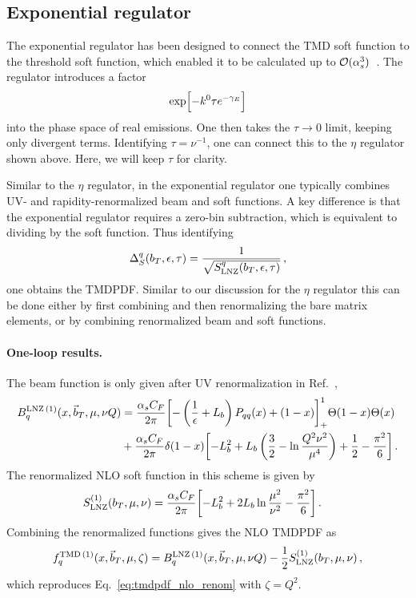 \documentclass[11pt,a4paper]{article}
\DeclareRobustCommand{\eq}[1]{Eq.~\eqref{eq:#1}}
\DeclareRobustCommand{\mycite}[1]{Ref.~\cite{#1}}
\newcommand{\eps}{\epsilon}
\newcommand{\nn}{\nonumber}
\newcommand{\as}{\alpha_s}
\newcommand\TMD{\mathrm{TMD}}
\newcommand{\bt}{\vec b_T}
\begin{document}
\subsection{Exponential regulator}

The exponential regulator \cite{Li:2016axz} has been designed to connect the TMD soft function to the
threshold soft function, which enabled it to be calculated up to ${\cal O}(\alpha_s^3)$~\cite{Li:2016ctv}.
The regulator introduces a factor
\begin{equation}
 \exp\Bigl[ - k^0 \tau e^{-\gamma_E} \Bigr]
\end{equation}
into the phase space of real emissions.
One then takes the $\tau\to0$ limit, keeping only divergent terms.
Identifying $\tau = \nu^{-1}$, one can connect this to the $\eta$ regulator shown above.
Here, we will keep $\tau$ for clarity.

Similar to the $\eta$ regulator, in the exponential regulator one typically combines UV- and rapidity-renormalized beam and soft functions. A key difference is that the exponential regulator requires a zero-bin subtraction, which is equivalent to dividing by the soft function. Thus identifying
\begin{align}
 \Delta_S^q(b_T,\eps,\tau) = \frac{1}{\sqrt{S^q_{\rm LNZ}(b_T,\eps,\tau)}}
\,,\end{align}
one obtains the TMDPDF. Similar to our discussion for the $\eta$ regulator this can be done either by first combining and then renormalizing the bare matrix elements,
or by combining renormalized beam and soft functions.

\paragraph{One-loop results.}
The beam function is only given after UV renormalization in \mycite{HuaXing},
\begin{align} \label{eq:beam_unsub_nlo_exp}
 B_{q}^{{\rm LNZ}\,(1)}(x, \bt, \mu, \nu Q)
  &= \frac{\as C_F}{2\pi} \biggl[ - \left(\frac{1}{\eps} + L_b\right) P_{qq}(x) + (1-x) \biggr]_+^1\Theta(1-x)\Theta(x)
 \nn\\&
  + \frac{\as C_F}{2\pi} \delta(1-x) \biggl[ - L_b^2 + L_b \left(\frac{3}{2} - \ln\frac{Q^2 \nu^2}{\mu^4} \right) + \frac{1}{2}  - \frac{\pi^2}{6}\biggr]
\,.\end{align}
The renormalized NLO soft function in this scheme is given by \cite{Li:2016axz}
\begin{align} \label{eq:soft_nlo_exp}
 S^{(1)}_{\rm LNZ}(b_T,\mu,\nu) &
 = \frac{\as C_F}{2\pi} \biggl[ - L_b^2 + 2 L_b \ln\frac{\mu^2}{\nu^2} - \frac{\pi^2}{6} \biggr]
\,.\end{align}
Combining the renormalized functions gives the NLO TMDPDF as
\begin{align}
 f^{\TMD\,(1)}_q(x,\bt,\mu,\zeta) = B_{q}^{{\rm LNZ}\,(1)}(x, \bt, \mu, \nu Q) - \frac{1}{2} S^{(1)}_{\rm LNZ}(b_T,\mu,\nu)
\,,\end{align}
which reproduces \eq{tmdpdf_nlo_renom} with $\zeta = Q^2$.
\end{document}
